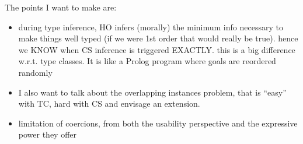 The points I want to make are:
\begin{itemize}
\item during type inference, HO infers (morally) the minimum
	info necessary to make things well typed (if we were 1st order
	that would really be true).
	hence we KNOW when CS inference is triggered EXACTLY.
	this is a big difference w.r.t. type classes. It is like a
	Prolog program where goals are reordered randomly
\item I also want to talk about the overlapping instances problem,
	that is ``easy'' with TC, hard with CS and envisage an
	extension.
\item limitation of coercions, from both the usability perspective and
	the expressive power they offer
\end{itemize}
